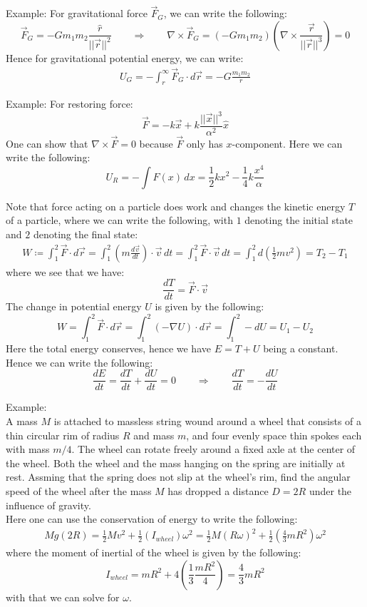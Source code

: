 \documentclass[11pt,oneside]{book}
\theoremstyle{break}
\theoremstyle{break}
\newcommand{\example}{\color{green}Example: \color{black}}
\begin{document}
\hfill\break
\example
For gravitational force $\vec{F}_G$, we can write the following:\\
$$\vec{F}_G  = -Gm_1m_2\frac{\hat{r}}{||\vec{r}||^2} \qquad \Rightarrow \qquad \nabla \times \vec{F}_G = (-Gm_1m_2) \left(\nabla \times \frac{\vec{r}}{||\vec{r}||^3}\right) = 0$$
Hence for gravitational potential energy, we can write:
\begin{align*}
U_G = -\int_r^\infty \vec{F}_G \cdot d\vec{r} = -G \frac{m_1m_2}{r}
\end{align*}

\example For restoring force: 
$$\vec{F} = -k\vec{x} + k \frac{||\vec{x}||^3}{\alpha^2} \hat{x}$$
One can show that $\nabla \times \vec{F} = 0$ because $\vec{F}$ only has $x$-component. Here we can write the following:
$$U_R = -\int F(x) \, dx = \frac{1}{2}kx^2 - \frac{1}{4}k \frac{x^4}{\alpha}$$


\hfill\break\hfill\break
Note that force acting on a particle does work and changes the kinetic energy $T$ of a particle, where we can write the following, with $1$ denoting the initial state and $2$ denoting the final state:
\begin{align*}
W \coloneqq \int_1^2 \vec{F}\cdot d\vec{r} = \int_1^2 \left( m\frac{d\vec{v}}{dt}\right) \cdot \vec{v}\, dt = \int_1^2 \vec{F}\cdot \vec{v}\, dt = \int_1^2 d\left( \frac{1}{2}mv^2\right) = T_2 - T_1 
\end{align*}
where we see that we have:
$$\frac{dT}{dt} = \vec{F} \cdot \vec{v}$$
The change in potential energy $U$ is given by the following:
$$W  = \int_1^2 \vec{F}\cdot d\vec{r} = \int_1^2 (-\nabla U)\cdot d\vec{r} = \int_1^2 -dU = U_1 - U_2$$
Here the total energy conserves, hence we have $E = T+U$ being a constant. Hence we can write the following:
$$\frac{dE}{dt} = \frac{dT}{dt}+ \frac{dU}{dt}= 0 \qquad \Rightarrow \qquad \frac{dT}{dt} = -\frac{dU}{dt}$$

\example\\
A mass $M$ is attached to massless string wound around a wheel that consists of a thin circular rim of radius $R$ and mass $m$, and four evenly space thin spokes each with mass $m/4$. The wheel can rotate freely around a fixed axle at the center of the wheel. Both the wheel and the mass hanging on the spring are initially at rest. Assming that the spring does not slip at the wheel's rim, find the angular speed of the wheel after the mass $M$ has dropped a distance $D= 2R$ under the influence of gravity.\\

Here one can use the conservation of energy to write the following:
\begin{align*}
Mg(2R) = \frac{1}{2}Mv^2 + \frac{1}{2}(I_{wheel})\omega^2 = \frac{1}{2}M(R\omega)^2 + \frac{1}{2}\left(\frac{4}{3}mR^2\right) \omega^2
\end{align*}
where the moment of inertial of the wheel is given by the following:
$$I_{wheel} = mR^2 + 4\left(\frac{1}{3}\frac{mR^2}{4}\right) = \frac{4}{3}mR^2$$
with that we can solve for $\omega$.
\end{document}
